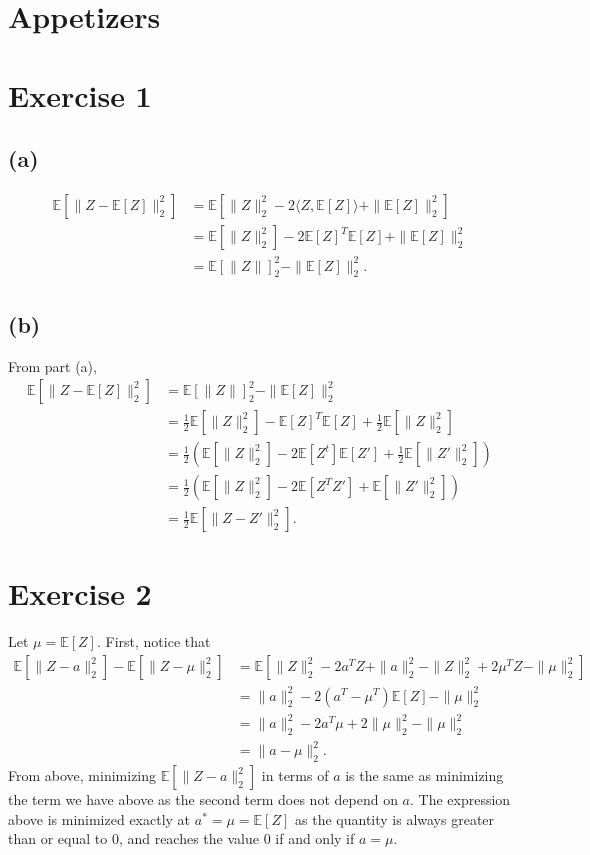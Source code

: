 \section{Appetizers}

\section*{Exercise 1}
\subsection*{(a)}
\begin{align*}
	\mathbb{E}[\|Z - \mathbb{E}[Z]\|_2^2] 
	&= \mathbb{E}[\|Z\|_2^2 - 2 \langle Z, \mathbb{E}[Z] \rangle + \|\mathbb{E}[Z]\|_2^2] \\
	&= \mathbb{E}[\|Z\|_2^2] - 2 \mathbb{E}[Z]^T \mathbb{E}[Z] + \|\mathbb{E}[Z]\|_2^2 \\
	&= \mathbb{E}[\|Z\|]_2^2 - \|\mathbb{E}[Z]\|_2^2.
\end{align*}

\subsection*{(b)}
From part (a), 
\begin{align*}
	\mathbb{E}[\|Z - \mathbb{E}[Z]\|_2^2] 
	&= \mathbb{E}[\|Z\|]_2^2 - \|\mathbb{E}[Z]\|_2^2 \\
	&= \frac{1}{2}\mathbb{E}[\|Z\|_2^2] - \mathbb{E}[Z]^T \mathbb{E}[Z] + \frac{1}{2}\mathbb{E}[\|Z\|_2^2] \\
	&= \frac{1}{2} (\mathbb{E}[\|Z\|_2^2] - 2 \mathbb{E}[Z^t]\mathbb{E}[Z'] 
	+ \frac{1}{2}\mathbb{E}[\|Z'\|_2^2]) \\
	&= \frac{1}{2} (\mathbb{E}[\|Z\|_2^2] - 2 \mathbb{E}[Z^T Z'] + \mathbb{E}[\|Z'\|_2^2]) \\
	&= \frac{1}{2}\mathbb{E}[\|Z - Z'\|_2^2].
\end{align*}


\newpage
\section*{Exercise 2}
Let $\mu = \mathbb{E}[Z]$. First, notice that 
\begin{align*}
	\mathbb{E}[\|Z - a\|_2^2] - \mathbb{E}[\|Z - \mu\|_2^2] 
	&= \mathbb{E}[\|Z\|_2^2 - 2a^T Z + \|a\|_2^2 - \|Z\|_2^2 + 2 \mu^T Z - \|\mu\|_2^2] \\
	&= \|a\|_2^2 - 2(a^T - \mu^T)\mathbb{E}[Z] - \|\mu\|_2^2 \\
	&= \|a\|_2^2 - 2a^T \mu + 2\|\mu\|_2^2 - \|\mu\|_2^2 \\
	&= \|a - \mu\|_2^2.
\end{align*}
From above, minimizing $\mathbb{E}[\|Z - a\|_2^2]$ in terms of $a$ is the same as minimizing the term 
we have above as the second term does not depend on $a$. The expression above is minimized exactly at 
$a^* = \mu = \mathbb{E}[Z]$ as the quantity is always greater than or equal to 0, and reaches the value 
$0$ if and only if $a = \mu$.


